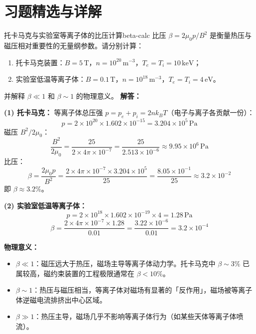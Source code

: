
\section*{习题精选与详解}
{}

\begin{example}{托卡马克与实验室等离子体的比压计算}{beta-calc}
比压 $\beta = 2\mu_0 p / B^2$ 是衡量热压与磁压相对重要性的无量纲参数。请分别计算：
\begin{enumerate}[label=(\arabic*)]
\item 托卡马克装置：$B=5\,\mathrm{T}$，$n=10^{20}\,\mathrm{m}^{-3}$，$T_e=T_i=10\,\mathrm{keV}$；
\item 实验室低温等离子体：$B=0.1\,\mathrm{T}$，$n=10^{18}\,\mathrm{m}^{-3}$，$T_e=T_i=4\,\mathrm{eV}$。
\end{enumerate}
并解释 $\beta\ll 1$ 和 $\beta\sim 1$ 的物理意义。
\tcblower
\textbf{解答：}

\textbf{(1) 托卡马克：}
等离子体总压强 $p = p_e + p_i = 2nk_{\!B}T$（电子与离子各贡献一份）：
\[
p = 2\times 10^{20}\times 1.602\times 10^{-15} = 3.204\times 10^5\,\mathrm{Pa}
\]
磁压 $B^2/2\mu_0$：
\[
\frac{B^2}{2\mu_0} = \frac{25}{2\times 4\pi\times 10^{-7}} = \frac{25}{2.513\times 10^{-6}} \approx 9.95\times 10^6\,\mathrm{Pa}
\]
比压：
\[
\beta = \frac{2\mu_0 p}{B^2} = \frac{2\times 4\pi\times 10^{-7}\times 3.204\times 10^5}{25} = \frac{8.05\times 10^{-1}}{25} \approx 3.2\times 10^{-2}
\]
即 $\beta \approx 3.2\%$。

\textbf{(2) 实验室低温等离子体：}
\[
p = 2\times 10^{18}\times 1.602\times 10^{-19}\times 4 = 1.28\,\mathrm{Pa}
\]
\[
\beta = \frac{2\times 4\pi\times 10^{-7}\times 1.28}{0.01} = \frac{3.22\times 10^{-6}}{0.01} = 3.2\times 10^{-4}
\]

\textbf{物理意义：}
\begin{itemize}[leftmargin=*,itemsep=0pt]
\item $\beta\ll 1$：磁压远大于热压，磁场主导等离子体动力学。托卡马克中 $\beta\sim 3\%$ 已属较高，磁约束装置的工程极限通常在 $\beta<10\%$。
\item $\beta\sim 1$：热压与磁压相当，等离子体对磁场有显著的「反作用」，磁场被等离子体逆磁电流排挤出中心区域。
\item $\beta\gg 1$：热压主导，磁场几乎不影响等离子体行为（如某些天体等离子体喷流）。
\end{itemize}
\end{example}

